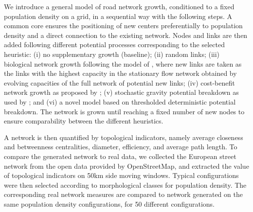 \documentclass[letterpaper]{article}
\begin{document}
We introduce a general model of road network growth, conditioned to a fixed population density on a grid, in a sequential way with the following steps. A common core ensures the positioning of new centers preferentially to population density and a direct connection to the existing network. Nodes and links are then added following different potential processes corresponding to the selected heuristic: (i) no supplementary growth (baseline); (ii) random links; (iii) biological network growth following the model of \cite{tero2010rules}, where new links are taken as the links with the highest capacity in the stationary flow network obtained by evolving capacities of the full network of potential new links; (iv) cost-benefit network growth as proposed by \cite{louf2013emergence}; (v) stochastic gravity potential breakdown as used by \cite{schmitt2014modelisation}; and (vi) a novel model based on thresholded deterministic potential breakdown. The network is grown until reaching a fixed number of new nodes to ensure comparability between the different heuristics.

A network is then quantified by topological indicators, namely average closeness and betweenness centralities, diameter, efficiency, and average path length. To compare the generated network to real data, we collected the European street network from the open data provided by OpenStreetMap, and extracted the value of topological indicators on 50km side moving windows. Typical configurations were then selected according to morphological classes for population density. The corresponding real network measures are compared to network generated on the same population density configurations, for 50 different configurations.
\end{document}
